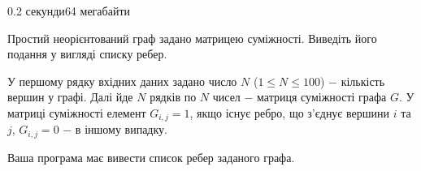 \begin{problem}{}{}{}{0.2 секунди}{64 мегабайти}

Простий неорієнтований граф задано матрицею суміжності. Виведіть його подання у вигляді списку ребер.

\InputFile
У першому рядку вхідних даних задано число $N$ ($1 \le N \le 100$) $-$ кількість вершин у графі.
Далі йде $N$ рядків по $N$ чисел $-$ матриця суміжності графа $G$. У матриці суміжності елемент $G_{i,j}=1$, якщо
існує ребро, що з'єднує вершини $i$ та $j$, $G_{i,j}=0$ $-$ в іншому випадку.

\OutputFile
Ваша програма має вивести список ребер заданого графа.

\Example

\begin{example}
%
\end{example}

\end{problem}

